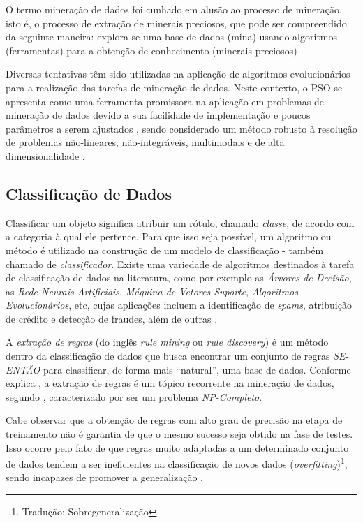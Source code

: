 \documentclass[
	12pt,				%
	openany,			%
	oneside,	
	a4paper,			%
	brazil,				%
	]{unimontes-ppgmsc-abntex2}
\begin{document}
O termo mineração de dados foi cunhado em alusão ao processo de mineração, isto é, o processo de extração de minerais preciosos, que pode ser compreendido da seguinte maneira: explora-se uma base de dados (mina) usando algoritmos (ferramentas) para a obtenção de conhecimento (minerais preciosos) \cite{Castro_2016}. 

Diversas tentativas têm sido utilizadas na aplicação de algoritmos evolucionários para a realização das tarefas de mineração de dados. Neste contexto, o PSO se apresenta como uma ferramenta promissora na aplicação em problemas de mineração de dados devido a sua facilidade de implementação e poucos parâmetros a serem ajustados \cite{Wang_2007}, sendo considerado um método robusto à resolução de problemas não-lineares, não-integráveis, multimodais e de alta dimensionalidade \cite{Krohling_2004}. 


\subsection{Classificação de Dados}
\label{sec:classif_dados}

Classificar um objeto significa atribuir um rótulo, chamado {\em classe}, de acordo com a categoria à qual ele pertence. Para que isso seja possível, um algoritmo ou método é utilizado na construção de um modelo de classificação - também chamado de {\em classificador}. Existe uma variedade de algoritmos destinados à tarefa de classificação de dados na literatura, como por exemplo as {\em Árvores de Decisão}, as {\em Rede Neurais Artificiais}, {\em Máquina de Vetores Suporte}, {\em Algoritmos Evolucionários}, etc, cujas aplicações incluem a identificação de {\em spams}, atribuição de crédito e detecção de fraudes, além de outras \cite{Castro_2016}.

A {\em extração de regras} (do inglês {\em rule mining} ou {\em rule discovery}) é um método dentro da classificação de dados que busca encontrar um conjunto de regras {\em SE-ENTÃO} para classificar, de forma mais ``natural'',  uma base de dados. Conforme explica , a extração de regras é um tópico recorrente na mineração de dados, segundo , caracterizado por ser um problema {\em NP-Completo}.

Cabe observar que a obtenção de regras com alto grau de precisão na etapa de treinamento não é garantia de que o mesmo sucesso seja obtido na fase de testes. Isso ocorre pelo fato de que regras muito adaptadas a um determinado conjunto de dados tendem a ser ineficientes na classificação de novos dados ({\em overfitting})\footnote{Tradução: Sobregeneralização}, sendo incapazes de promover a generalização \cite{Pereira_2010}. 
\end{document}
